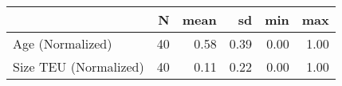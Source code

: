 
\begin{tabular}[t]{lrrrrr}
\toprule
  & N & mean & sd & min & max\\
\midrule
Age (Normalized) & 40 & 0.58 & 0.39 & 0.00 & 1.00\\
Size TEU (Normalized) & 40 & 0.11 & 0.22 & 0.00 & 1.00\\
\bottomrule
\end{tabular}
